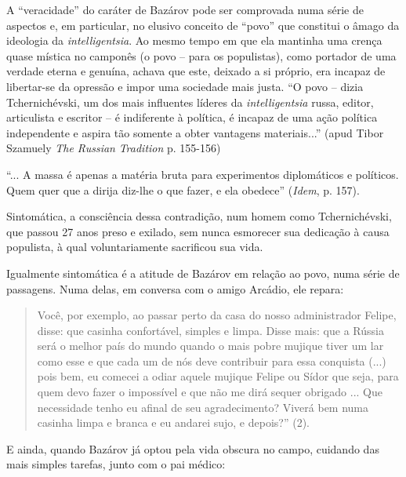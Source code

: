 A ``veracidade'' do caráter de Bazárov pode ser comprovada numa série de
aspectos e, em particular, no elusivo conceito de ``povo'' que constitui
o âmago da ideologia da \emph{intelligentsia}. Ao mesmo tempo em que ela
mantinha uma crença quase mística no camponês (o povo -- para os
populistas), como portador de uma verdade eterna e genuína, achava que
este, deixado a si próprio, era incapaz de libertar-se da opressão e
impor uma sociedade mais justa. ``O povo -- dizia Tchernichévski, um dos
mais influentes líderes da \emph{intelligentsia} russa, editor,
articulista e escritor -- é indiferente à política, é incapaz de uma
ação política independente e aspira tão somente a obter vantagens
materiais...'' (apud Tibor Szamuely \emph{The Russian} { }
\emph{Tradition} p. 155-156)

``... A massa é apenas a matéria bruta para experimentos diplomáticos e
políticos. Quem quer que a dirija diz-lhe o que fazer, e ela obedece''
(\emph{Idem}, p. 157).

Sintomática, a consciência dessa contradição, num homem como
Tchernichévski, que passou 27 anos preso e exilado, sem nunca esmorecer
sua dedicação à causa populista, à qual voluntariamente sacrificou sua
vida.

Igualmente sintomática é a atitude de Bazárov em relação ao povo, numa
série de passagens. Numa delas, em conversa com o amigo Arcádio, ele
repara:

\begin{quote}
Você, por exemplo, ao passar perto da casa do nosso administrador
Felipe, disse: que casinha confortável, simples e limpa. Disse mais: que
a Rússia será o melhor país do mundo quando o mais pobre mujique tiver
um lar como esse e que cada um de nós deve contribuir para essa
conquista (...) pois bem, eu comecei a odiar aquele mujique Felipe ou
Sídor que seja, para quem devo fazer o impossível e que não me dirá
sequer obrigado ... Que necessidade tenho eu afinal de seu
agradecimento? Viverá bem numa casinha limpa e branca e eu andarei sujo,
e depois?'' (2).
\end{quote}

E ainda, quando Bazárov já optou pela vida obscura no campo, cuidando
das mais simples tarefas, junto com o pai médico:

